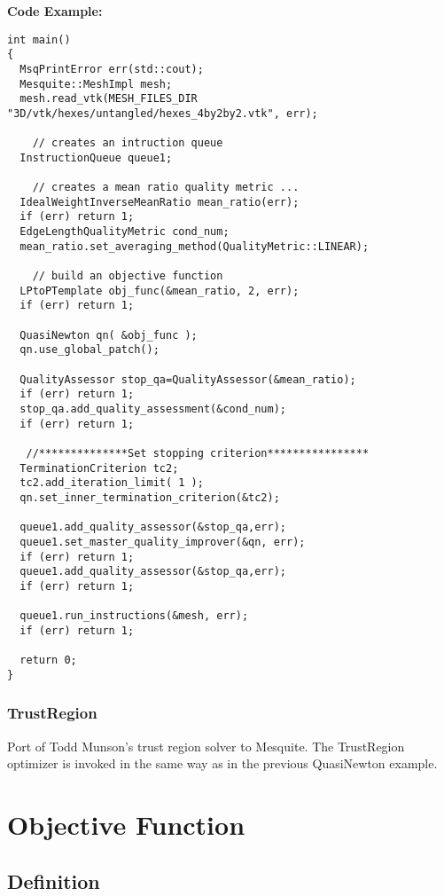 \textbf{Code Example:}

\begin{lstlisting}[frame=single]
int main()
{
  MsqPrintError err(std::cout);
  Mesquite::MeshImpl mesh;
  mesh.read_vtk(MESH_FILES_DIR "3D/vtk/hexes/untangled/hexes_4by2by2.vtk", err);
  
    // creates an intruction queue
  InstructionQueue queue1;
  
    // creates a mean ratio quality metric ...
  IdealWeightInverseMeanRatio mean_ratio(err);
  if (err) return 1;
  EdgeLengthQualityMetric cond_num;
  mean_ratio.set_averaging_method(QualityMetric::LINEAR);
  
    // build an objective function
  LPtoPTemplate obj_func(&mean_ratio, 2, err);
  if (err) return 1;

  QuasiNewton qn( &obj_func );
  qn.use_global_patch();
  
  QualityAssessor stop_qa=QualityAssessor(&mean_ratio);
  if (err) return 1;
  stop_qa.add_quality_assessment(&cond_num);
  if (err) return 1;
    
   //**************Set stopping criterion****************
  TerminationCriterion tc2;
  tc2.add_iteration_limit( 1 );
  qn.set_inner_termination_criterion(&tc2);

  queue1.add_quality_assessor(&stop_qa,err);
  queue1.set_master_quality_improver(&qn, err); 
  if (err) return 1;
  queue1.add_quality_assessor(&stop_qa,err);
  if (err) return 1;

  queue1.run_instructions(&mesh, err);
  if (err) return 1;
  
  return 0;
}
\end{lstlisting}


\subsubsection{TrustRegion}
Port of Todd Munson's trust region solver to Mesquite.  The TrustRegion optimizer is invoked in the same way as in the previous QuasiNewton example.


\section{Objective Function}
\label{sec:ObjectiveFunction}

\subsection{Definition}

